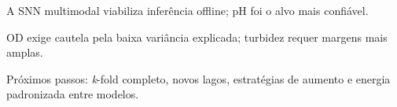 \PosterBody
\begin{posteritems}
  \item A SNN multimodal viabiliza inferência offline; pH foi o alvo mais confiável.
  \item OD exige cautela pela baixa variância explicada; turbidez requer margens mais amplas.
  \item Próximos passos: \textit{k}-fold completo, novos lagos, estratégias de aumento e energia padronizada entre modelos.
\end{posteritems}
